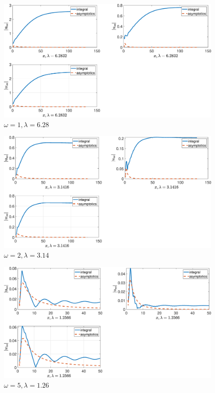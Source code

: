 \begin{figure}[!h]\centering\includegraphics[scale=0.38]{ussw1cp(1)2cp(2)1cs(1)0,5cs(20,3rho(1)2rho(2)1.eps}\caption{$ \omega = 1, \lambda = 6.28$}\end{figure}

\begin{figure}[!h]\centering\includegraphics[scale=0.38]{ussw2cp(1)2cp(2)1cs(1)0,5cs(20,3rho(1)2rho(2)1.eps}\caption{$ \omega = 2, \lambda = 3.14$}\end{figure}

\begin{figure}[!h]\centering\includegraphics[scale=0.38]{ussw5cp(1)2cp(2)1cs(1)0,5cs(20,3rho(1)2rho(2)1.eps}\caption{$ \omega = 5, \lambda = 1.26$}\end{figure}

